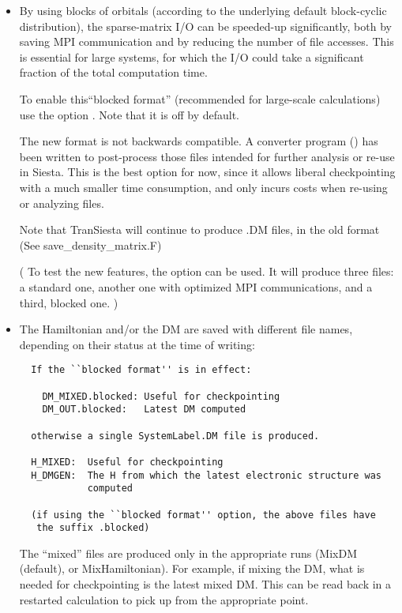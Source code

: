 \begin{itemize}  

\item By using blocks of orbitals (according to the underlying default
block-cyclic distribution), the sparse-matrix I/O can be speeded-up
significantly, both by saving MPI communication and by reducing the
number of file accesses. This is essential for large systems, for
which the I/O could take a significant fraction of the total
computation time.
  
To enable this``blocked format'' (recommended for large-scale
calculations) use the option . Note that
it is off by default.
  
The new format is not backwards compatible. A converter program
() has been written to post-process
those files intended for further analysis or re-use in Siesta. This is
the best option for now, since it allows liberal checkpointing with a
much smaller time consumption, and only incurs costs when re-using or
analyzing files.
  
Note that TranSiesta will continue to produce .DM files, in the old
format (See save\_density\_matrix.F)

( To test the new features, the option  can be used. It
will produce three files: a standard one, another one with optimized
MPI communications, and a third, blocked one.  )

\item The Hamiltonian and/or the DM are saved with different file
  names, depending on their status at the time of writing:

\begin{verbatim}  
  If the ``blocked format'' is in effect:

    DM_MIXED.blocked: Useful for checkpointing
    DM_OUT.blocked:   Latest DM computed
  
  otherwise a single SystemLabel.DM file is produced.
  
  H_MIXED:  Useful for checkpointing
  H_DMGEN:  The H from which the latest electronic structure was
            computed

  (if using the ``blocked format'' option, the above files have
   the suffix .blocked)

\end{verbatim}  
  
The ``mixed'' files are produced only in the appropriate runs (MixDM
(default), or MixHamiltonian). For example, if mixing the DM, what is
needed for checkpointing is the latest mixed DM. This can be read back
in a restarted calculation to pick up from the appropriate point.
  

\end{itemize}
